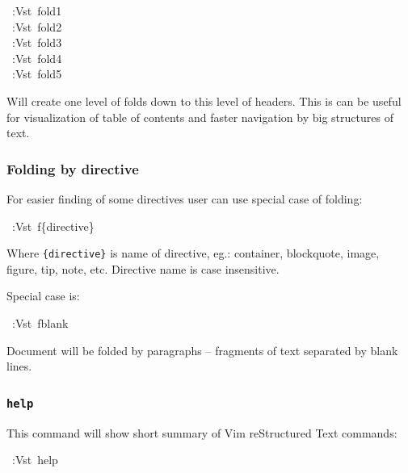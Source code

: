 \documentclass[12pt]{article}
\begin{document}
\begin{ttfamily}\begin{flushleft}
\mbox{~:Vst~fold1}\\
\mbox{~:Vst~fold2}\\
\mbox{~:Vst~fold3}\\
\mbox{~:Vst~fold4}\\
\mbox{~:Vst~fold5}\\
\end{flushleft}\end{ttfamily}

Will create one level of folds down to this level of headers. This is can be
useful for visualization of table of contents and faster navigation by big
structures of text.

\hypertarget{lfolding-by-directive}{}
\subsubsection{Folding by directive}

For easier finding of some directives user can use special case of folding:

\begin{ttfamily}\begin{flushleft}
\mbox{~:Vst~f\{directive\}}\\
\end{flushleft}\end{ttfamily}

Where \texttt{\{directive\}} is name of directive, eg.: container, blockquote,
image, figure, tip, note, etc. Directive name is case insensitive.

Special case is:

\begin{ttfamily}\begin{flushleft}
\mbox{~:Vst~fblank}\\
\end{flushleft}\end{ttfamily}

Document will be folded by paragraphs -- fragments of text separated by
blank lines.

\hypertarget{l9696help9696}{}
\subsubsection{\texttt{help}}

This command will show short summary of Vim reStructured Text commands:

\begin{ttfamily}\begin{flushleft}
\mbox{~:Vst~help}\\
\end{flushleft}\end{ttfamily}
\end{document}
